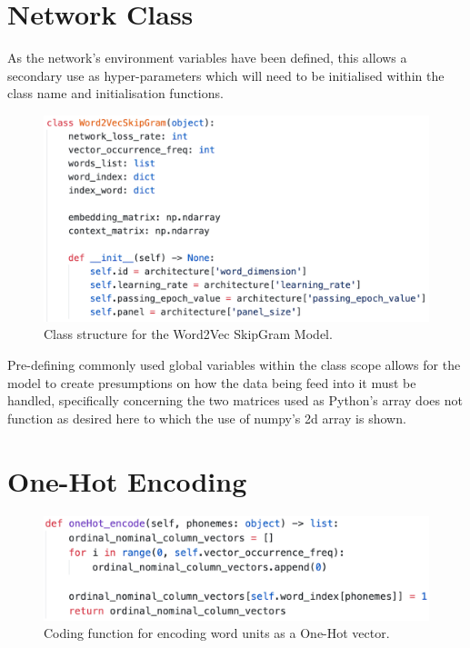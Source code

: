 \section{Network Class}

As the network's environment variables have been defined, this allows a secondary use as hyper-parameters which will need to be initialised within the class name and initialisation functions.

\begin{figure}[H]
    \centering
    \includegraphics[width=\textwidth]{figures/chapter-6/word2vecclass.png}
    \caption[Class structure for the Word2Vec SkipGram Model]{Class structure for the Word2Vec SkipGram Model.
    \label{fig:word2vec_class}}
\end{figure}

Pre-defining commonly used global variables within the class scope allows for the model to create presumptions on how the data being feed into it must be handled, specifically concerning the two matrices used as Python's array does not function as desired here to which the use of numpy's 2d array is shown.

\section{One-Hot Encoding}

\begin{figure}[H]
    \centering
    \includegraphics[width=\textwidth]{figures/chapter-6/OneHotEncoding.png}
    \caption[Coding function for encoding word units as a One-Hot vector]{Coding function for encoding word units as a One-Hot vector.
    \label{fig:onehot_encoding}}
\end{figure}

